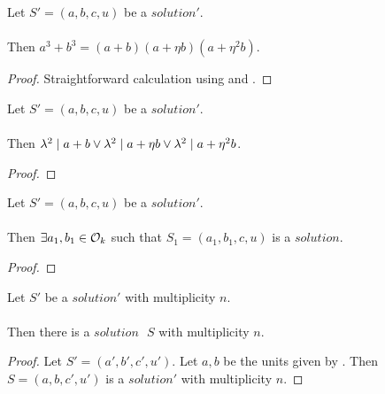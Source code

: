 \begin{lemma}
    \label{lmm:cube_add_cube_eq_mul}
    \leanok
    Let $S'=(a, b, c, u)$ be a $solution'$.\\\\
    Then $a^3 + b^3 = (a + b) (a + \eta b)  (a + \eta^2 b)$.
\end{lemma}
\begin{proof}
    \leanok
    Straightforward calculation using 
    and .
\end{proof}

\begin{lemma}
    \label{lmm:lambda_sq_dvd_or_dvd_or_dvd}
    \leanok
    Let $S'=(a, b, c, u)$ be a $solution'$.\\\\
    Then $\lambda^2 \mid a + b \lor \lambda^2 \mid a +
    \eta  b \lor \lambda^2 \mid a + \eta^2  b$.
\end{lemma}
\begin{proof}
    \leanok
\end{proof}

\begin{lemma}
    \label{lmm:ex_dvd_a_add_b}
    \leanok
    Let $S'=(a, b, c, u)$ be a $solution'$.\\\\
    Then $\exists a_1,b_1 \in \mathcal{O}_k$ such that $S_1=(a_1,b_1,c,u)$ is a $solution$.
\end{lemma}
\begin{proof}
    \leanok
\end{proof}

\begin{lemma}
    \label{lmm:exists_Solution_of_Solution1}
    \leanok
    Let $S'$ be a $solution'$ with multiplicity $n$.\\\\
    Then there is a $solution\text{ }S$ with multiplicity $n$.
\end{lemma}
\begin{proof}
    \leanok
    Let $S'=(a',b',c',u')$. Let $a, b$ be the units given by .
    Then $S=(a,b,c',u')$ is a $solution'$ with multiplicity $n$.
\end{proof}


